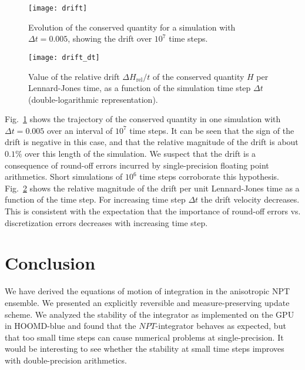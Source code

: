 \documentclass[12pt,letter]{article}
\begin{document}
\begin{figure}
\centering\texttt{[image: drift]}
\caption{Evolution of the conserved quantity for a simulation with
$\Delta t=0.005$, showing the drift over $10^7$ time steps.}
\label{fig:drift}
\end{figure}

\begin{figure}
\centering\texttt{[image: drift\_dt]}
\caption{Value of the relative drift $\Delta H_{\mathrm{rel}}/t$ of
  the conserved quantity $H$ per Lennard-Jones time, as a function of
  the simulation time step $\Delta t$ (double-logarithmic representation).}
\label{fig:drift_dt}
\end{figure}

Fig.~\ref{fig:drift} shows the trajectory of the conserved quantity in
one simulation with $\Delta t=0.005$ over an interval of $10^7$ time
steps. It can be seen that the sign of the drift is negative in this
case, and that the relative magnitude of the drift is about $0.1\%$
over this length of the simulation. We suspect that the drift is a
consequence of round-off errors incurred by single-precision floating
point arithmetics.  Short simulations of $10^6$ time steps corroborate
this hypothesis. Fig.~\ref{fig:drift_dt} shows the relative magnitude
of the drift per unit Lennard-Jones time as a function of the time
step. For increasing time step $\Delta t$ the drift velocity
decreases. This is consistent with the expectation that the importance
of round-off errors vs. discretization errors decreases with
increasing time step.

\section{Conclusion}
We have derived the equations of motion of integration in the
anisotropic NPT ensemble. We presented an explicitly reversible and
measure-preserving update scheme. We analyzed the stability of the
integrator as implemented on the GPU in HOOMD-blue and found that the
$NPT$-integrator behaves as expected, but that too small time steps
can cause numerical problems at single-precision. It would be
interesting to see whether the stability at small time steps improves
with double-precision arithmetics.



\end{document}
